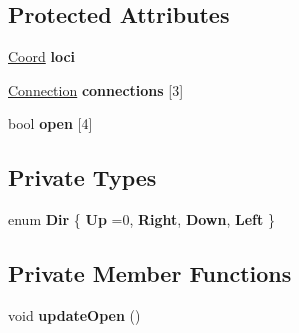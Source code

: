 \subsection*{Protected Attributes}
\begin{DoxyCompactItemize}
\item 
\hypertarget{classNode_ab53dfd4d0c1c14c6f52e10e7dd4a7d5b}{\hyperlink{structCoord}{Coord} {\bfseries loci}}\label{classNode_ab53dfd4d0c1c14c6f52e10e7dd4a7d5b}

\item 
\hypertarget{classNode_a8c1d4129f3781fc13810790f4f263fc0}{\hyperlink{structConnection}{Connection} {\bfseries connections} \mbox{[}3\mbox{]}}\label{classNode_a8c1d4129f3781fc13810790f4f263fc0}

\item 
\hypertarget{classNode_aeb24c6e7916dd967c826084094f71e63}{bool {\bfseries open} \mbox{[}4\mbox{]}}\label{classNode_aeb24c6e7916dd967c826084094f71e63}

\end{DoxyCompactItemize}
\subsection*{Private Types}
\begin{DoxyCompactItemize}
\item 
\hypertarget{classNode_a2d9bbf468b6e46a184fd9deec2ffb82a}{enum {\bfseries Dir} \{ {\bfseries Up} =0, 
{\bfseries Right}, 
{\bfseries Down}, 
{\bfseries Left}
 \}}\label{classNode_a2d9bbf468b6e46a184fd9deec2ffb82a}

\end{DoxyCompactItemize}
\subsection*{Private Member Functions}
\begin{DoxyCompactItemize}
\item 
\hypertarget{classNode_aca11179560b61f0d118c6d86865d20cc}{void {\bfseries update\+Open} ()}\label{classNode_aca11179560b61f0d118c6d86865d20cc}

\end{DoxyCompactItemize}
